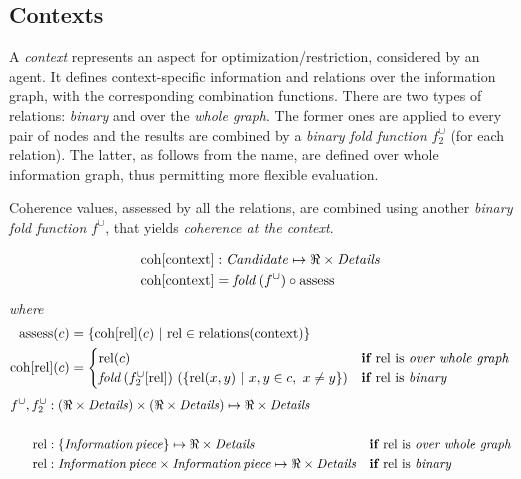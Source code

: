 \documentclass[../ThesisDoc]{subfiles}
\begin{document}
\providecommand{\rootdir}{..}


\subsection{Contexts}
\label{sec:solution-contexts}


A \emph{context} represents an aspect for optimization/restriction, considered
by an agent. It defines context-specific information and relations over the
information graph, with the corresponding combination functions. There are
two types of relations: \emph{binary} and over the \emph{whole graph}.
The former ones are applied to every pair of nodes and the results are combined
by a \emph{binary fold function} $f^\cup_2$ (for each relation).
The latter, as follows from the name, are defined over whole information graph,
thus permitting more flexible evaluation.

Coherence values, assessed by all the relations, are combined using another
\emph{binary fold function} $f^\cup$, that yields \emph{coherence at the context}.

\begin{align}
\begin{split}
  \mathrm{coh}[\mathrm{context}] &: \mathit{Candidate} \mapsto \Re \times \mathit{Details} \\
  \mathrm{coh}[\mathrm{context}] &= \mathit{fold}\,(f^\cup) \circ \mathrm{assess}
\end{split}
\end{align}
\emph{where}
\begin{align*}
    \mathrm{assess}(c) &=
      \lbrace \mathrm{coh}[\mathrm{rel}](c) ~|~ \mathrm{rel} \in \mathrm{relations}(\mathrm{context})
      \rbrace\\
    \mathrm{coh}[\mathrm{rel}](c) &= \begin{cases}
                       \mathrm{rel}(c) & \textbf{if } \mathrm{rel} \text{ is \emph{over whole graph}}
                       \\
                       \mathit{fold}\, (f^\cup_2[\mathrm{rel}]) ~
                                (\lbrace \mathrm{rel}(x,y) ~|~ x,y \in c, ~ x \not= y
                                 \rbrace)
                          & \textbf{if } \mathrm{rel} \text{ is \emph{binary}}
                     \end{cases}
\end{align*}
\begin{align*}
  f^\cup, f^\cup_2 &: (\Re \times \mathit{Details}) \times (\Re \times \mathit{Details})
                      \mapsto \Re \times \mathit{Details} & &
  \\ \\
  \mathrm{rel} &:\lbrace \mathit{Information\,piece} \rbrace
              \mapsto \Re \times \mathit{Details}
       & \textbf{if } & \mathrm{rel} \text{ is \emph{over whole graph}}
  \\
  \mathrm{rel} &:\mathit{Information\,piece} \times \mathit{Information\,piece}
              \mapsto \Re \times \mathit{Details}
       & \textbf{if } & \mathrm{rel} \text{ is \emph{binary}}
\end{align*}
\end{document}
